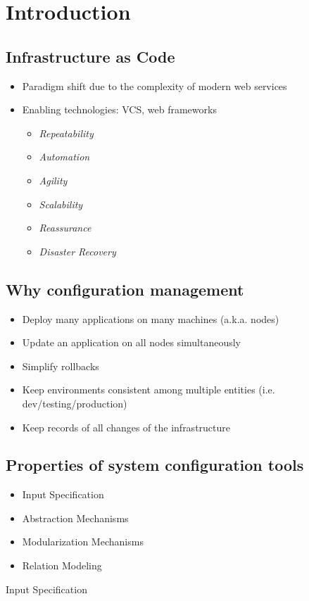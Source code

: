 \section{Introduction}

\subsection{Infrastructure as Code}

\begin{itemize}
\item Paradigm shift due to the complexity of modern web services
\item Enabling technologies: VCS, web frameworks
\begin{itemize}
\item \textit{Repeatability}
\item \textit{Automation}
\item \textit{Agility}
\item \textit{Scalability}
\item \textit{Reassurance}
\item \textit{Disaster Recovery}
\end{itemize}
\end{itemize}

\subsection{Why configuration management}

	\begin{itemize}
		\item Deploy many applications on many machines (a.k.a. nodes)
		\item Update an application on all nodes simultaneously
		\item Simplify rollbacks
		\item Keep environments consistent among multiple entities (i.e. dev/testing/production)
		\item Keep records of all changes of the infrastructure
	\end{itemize}
	
\subsection{Properties of system configuration tools}
\begin{itemize}
\item Input Specification
\item Abstraction Mechanisms
\item Modularization Mechanisms
\item Relation Modeling
\end{itemize}
\item{Input Specification}